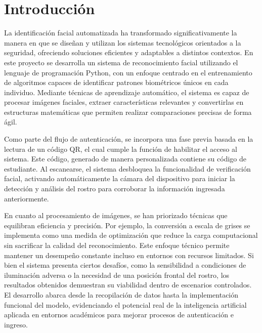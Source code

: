 \documentclass[12pt]{article}
\begin{document}
{\fontsize{12}{18}\selectfont %
\doublespacing
    
\sectionfont{\Large} 	%
\subsectionfont{\large} %
\subsubsectionfont{\normalsize}

\tableofcontents{}

\section{Introducción}
La identificación facial automatizada ha transformado significativamente la manera en que se diseñan y utilizan los sistemas tecnológicos orientados a la seguridad, ofreciendo soluciones eficientes y adaptables a distintos contextos. En este proyecto se desarrolla un sistema de reconocimiento facial utilizando el lenguaje de programación Python, con un enfoque centrado en el entrenamiento de algoritmos capaces de identificar patrones biométricos únicos en cada individuo. Mediante técnicas de aprendizaje automático, el sistema es capaz de procesar imágenes faciales, extraer características relevantes y convertirlas en estructuras matemáticas que permiten realizar comparaciones precisas de forma ágil.

Como parte del flujo de autenticación, se incorpora una fase previa basada en la lectura de un código QR, el cual cumple la función de habilitar el acceso al sistema. Este código, generado de manera personalizada contiene su código de estudiante. Al escanearse, el sistema desbloquea la funcionalidad de verificación facial, activando automáticamente la cámara del dispositivo para iniciar la detección y análisis del rostro para corroborar la información ingresada anteriormente.

En cuanto al procesamiento de imágenes, se han priorizado técnicas que equilibran eficiencia y precisión. Por ejemplo, la conversión a escala de grises se implementa como una medida de optimización que reduce la carga computacional sin sacrificar la calidad del reconocimiento. Este enfoque técnico permite mantener un desempeño constante incluso en entornos con recursos limitados. Si bien el sistema presenta ciertos desafíos, como la sensibilidad a condiciones de iluminación adversa o la necesidad de una posición frontal del rostro, los resultados obtenidos demuestran su viabilidad dentro de escenarios controlados. El desarrollo abarca desde la recopilación de datos hasta la implementación funcional del modelo, evidenciando el potencial real de la inteligencia artificial aplicada en entornos académicos para mejorar procesos de autenticación e ingreso.

}
\end{document}
